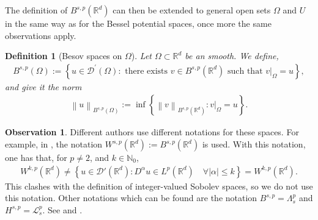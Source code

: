 \documentclass[
    a4paper,
    DIV=14,
    abstract=true,
    numbers=noenddot
]
{scrartcl}
\newtheorem{definition}[theorem]{Definition}
\theoremstyle{definition}
\newtheorem{observation}{Observation}
\newcommand{\set}[1]{\left\{#1\right\}}
\renewcommand{\norm}[1]{\left\lVert #1 \right\rVert}\renewcommand{\abs}[1]{\left| #1 \right|}
\newcommand\restr[2]{\left.#1\right|_{#2}}
\newcommand{\N}{\mathbb{N}}
\newcommand{\R}{\mathbb{R}}
\newcommand{\Dd}{\mathcal{D}}
\newcommand{\Ll}{\mathcal{L}}
\begin{document}
The definition of $B^{s,p}(\R^d)$ can then be extended to general open sets $\Omega $ and  $U$ in the same way as for the Bessel potential spaces, once more the same observations apply.
\begin{definition}[Besov spaces on $\Omega $]\label{besov def on U}
    Let $\Omega  \subset \R^d$ be an smooth. We define,
    \begin{align*}
        B^{s,p}(\Omega):=\left\{u \in \mathcal{D}^{\prime}(\Omega ): \text{ there exists } v \in B^{s,p}(\R^d) \text{ such that } \restr{v}{\Omega }=u\right\},
    \end{align*}
    and give it the norm
    \begin{align*}
        \norm{u}_{B^{s,p}(\Omega)}:= \inf \set{\norm{v}_{B^{s,p}(\R^d)}: \restr{v}{\Omega }=u}.
    \end{align*}
\end{definition}

\begin{observation}
    Different authors use different notations for these spaces. For example, in \cite{triebel1992theory}, the notation $W^{s,p}(\R^d):= B^{s,p}(\R^d)$ is used. With this notation, one has that, for $p \neq 2$, and $k \in \N_0$,
    \begin{align*}
        W^{k,p}(\R^d) \neq \set{ u \in \Dd'(\R^d) : D^\alpha u \in L^p(\R^d) \quad \forall \abs{\alpha}\leq   k}= W^{k,p}(\R^d).
    \end{align*}
    This clashes with the definition of integer-valued Sobolev spaces, so we do not use this notation. Other notations which can be found are  the notation $B^{s,p}= \Lambda^{p}_s$ and $H^{s,p}= \Ll ^{p}_s$. See \cite{stein1970singular} and \cite{biccari2018local}.
\end{observation}
\end{document}
